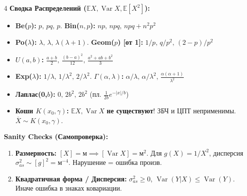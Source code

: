 \documentclass[8pt, a4paper, landscape]{extarticle}
\newcommand{\E}{\mathbb{E}}
\DeclareMathOperator{\Var}{Var}
\begin{document}
\begin{multicols*}{4}
\textbf{Сводка Распределений ($\E X, \Var X, \E[X^2]$):}
\begin{itemize}
    \item \textbf{Be($p$):} $p, \, pq, \, p$. \textbf{Bin($n,p$):} $np, \, npq, \, npq+n^2p^2$
    \item \textbf{Po($\lambda$):} $\lambda, \, \lambda, \, \lambda(\lambda+1)$. \textbf{Geom($p$) [от 1]:} $1/p, \, q/p^2, \, (2-p)/p^2$
    \item \textbf{$U(a,b)$:} $\frac{a+b}{2}, \, \frac{(b-a)^2}{12}, \, \frac{a^2+ab+b^2}{3}$
    \item \textbf{Exp($\lambda$):} $1/\lambda, \, 1/\lambda^2, \, 2/\lambda^2$. \textbf{$\Gamma(\alpha,\lambda)$:} $\alpha/\lambda, \, \alpha/\lambda^2, \, \frac{\alpha(\alpha+1)}{\lambda^2}$
    \item \textbf{Лаплас(0,$b$):} $0, \, 2b^2, \, 2b^2$ (пл. $\frac{1}{2b}e^{-|x|/b}$)
    \item \textbf{Коши $K(x_0, \gamma)$:} $\E X, \Var X$ \textbf{не существуют}! ЗБЧ и ЦПТ неприменимы. $\overline{X} \sim K(x_0, \gamma)$.
\end{itemize}

\textbf{Sanity Checks (Самопроверка):}
\begin{enumerate}
    \item \textbf{Размерность:} $[X]\!=\!\text{м} \implies [\Var X]\!=\!\text{м}^2$. Для $g(X)\!=\!1/X^2$, дисперсия $\sigma_{as}^2 \sim [g]^2 \!=\! \text{м}^{-4}$. Нарушение = ошибка произв.
    \item \textbf{Квадратичная форма / Дисперсия:} $\sigma_{as}^2 \ge 0$, $\Var(Y|X) \le \Var(Y)$. Иначе ошибка в знаках ковариации.
\end{enumerate}

\end{multicols*}
\end{document}

